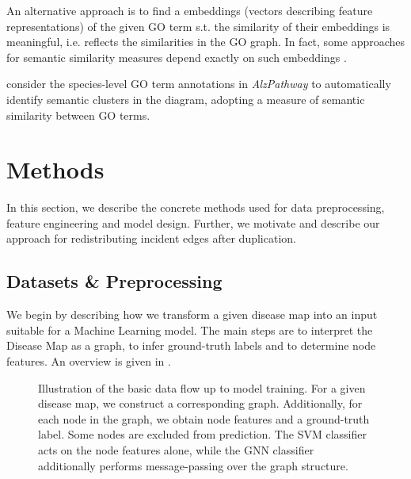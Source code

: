 \documentclass[
	fontsize=10pt, %
	twoside=false, %
	secnumdepth=1, %
  toc=indentunnumbered %
]{kaobook}
\begin{document}
An alternative approach is to find a embeddings (vectors describing feature
representations) of the given GO term s.t. the similarity of their embeddings is
meaningful, i.e. reflects the similarities in the GO graph. In fact, some
approaches for semantic similarity measures depend exactly on such embeddings
\cite{zhong_GO2VecTransformingGO_2020}.

\citeauthor{ostaszewski_ClusteringApproachesVisual_2018} consider the
species-level GO term annotations in \textit{AlzPathway} to automatically
identify semantic clusters in the diagram, adopting a measure of semantic
similarity between GO terms.











\chapter{Methods}
\label{sec:methods}

In this section, we describe the concrete methods used for data
preprocessing, feature engineering and model design. Further, we motivate and
describe our approach for redistributing incident edges after duplication.

\section{Datasets \& Preprocessing}
\label{sec:datasets}

We begin by describing how we transform a given disease map into an input
suitable for a Machine Learning model. The main steps are to interpret the
Disease Map as a graph, to infer ground-truth labels and to determine node
features. An overview is given in .

\begin{figure}[h]
  \centering
  \caption{Illustration of the basic data flow up to model training. For a given
    disease map, we construct a corresponding graph. Additionally, for each node
    in the graph, we obtain node features and a ground-truth label. Some nodes are
    excluded from prediction. The SVM classifier acts on the node features alone,
    while the GNN classifier additionally performs message-passing over the graph structure.}
  \label{fig:diag-pipeline}
\end{figure}
\end{document}
